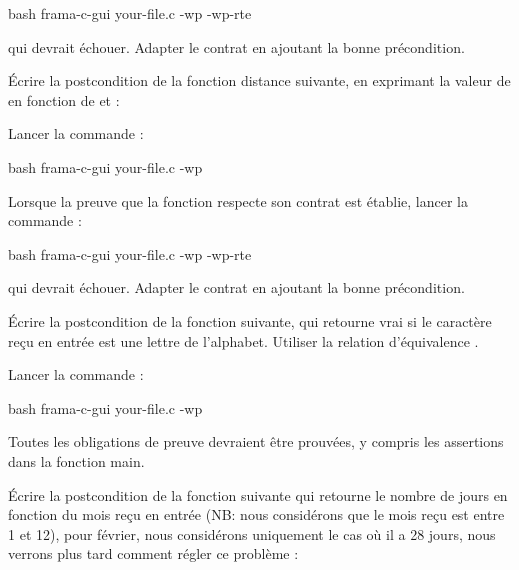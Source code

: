 \begin{CodeBlock}{bash}
frama-c-gui your-file.c -wp -wp-rte
\end{CodeBlock}


qui devrait échouer. Adapter le contrat en ajoutant la bonne précondition.




Écrire la postcondition de la fonction distance suivante, en exprimant
la valeur de  en fonction de  et
 :




Lancer la commande :


\begin{CodeBlock}{bash}
frama-c-gui your-file.c -wp
\end{CodeBlock}


Lorsque la preuve que la fonction respecte son contrat est établie, lancer
la commande :

\begin{CodeBlock}{bash}
frama-c-gui your-file.c -wp -wp-rte
\end{CodeBlock}


qui devrait échouer. Adapter le contrat en ajoutant la bonne précondition.




Écrire la postcondition de la fonction suivante, qui retourne vrai si le
caractère reçu en entrée est une lettre de l'alphabet. Utiliser la relation
d'équivalence  \CodeInline{<==>}.




Lancer la commande :


\begin{CodeBlock}{bash}
frama-c-gui your-file.c -wp
\end{CodeBlock}


Toutes les obligations de preuve devraient être prouvées, y compris les
assertions dans la fonction main.




Écrire la postcondition de la fonction suivante qui retourne le nombre de
jours en fonction du mois reçu en entrée (NB: nous considérons que le mois
reçu est entre 1 et 12), pour février, nous considérons uniquement le cas
où il a 28 jours, nous verrons plus tard comment régler ce problème :




